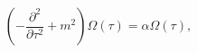 \begin{equation}
\left(-\frac{\partial ^{2}}{\partial \tau ^{2}}+m^{2}\right)\Omega \left(\tau \right)=\alpha \Omega \left(\tau \right),\label{tau eigenvalue eq}\end{equation}


